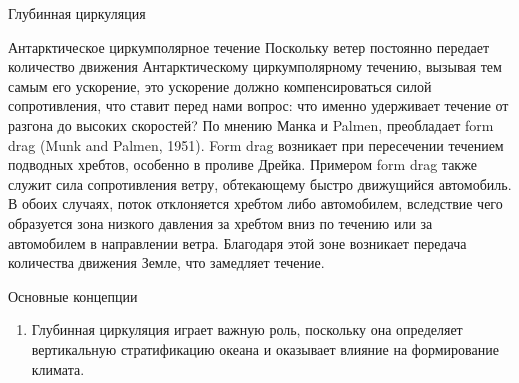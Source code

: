 \begin{chapter}{Глубинная циркуляция}
\begin{section}{Антарктическое циркумполярное течение}
Поскольку ветер постоянно передает количество движения Антарктическому
циркумполярному течению,
вызывая тем самым его ускорение, это ускорение должно компенсироваться
силой сопротивления, что ставит перед нами вопрос: что именно удерживает 
течение от разгона до высоких скоростей? По мнению Манка и Palmen, 
преобладает form drag (Munk and Palmen, 1951). Form
drag возникает при пересечении течением
подводных хребтов, особенно в проливе Дрейка. Примером form drag также
служит сила сопротивления ветру, обтекающему быстро движущийся автомобиль.
В обоих случаях, поток отклоняется хребтом либо автомобилем, вследствие чего
образуется зона низкого давления за хребтом вниз по течению или за автомобилем
в направлении ветра. Благодаря этой зоне возникает передача количества 
движения Земле, что замедляет течение.
%
\end{section}

\begin{section}{Основные концепции}
\begin{enumerate}
\item
Глубинная циркуляция играет важную роль, поскольку она определяет вертикальную
стратификацию океана и оказывает влияние на формирование климата.
%


\end{enumerate}
\end{section}
\end{chapter}

